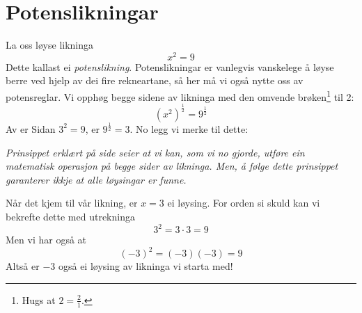 \newpage
{}
\section{Potenslikningar}
La oss løyse likninga
\[ x^2=9 \]
Dette kallast ei \textit{potenslikning}. Potenslikningar er vanlegvis vanskelege å løyse berre ved hjelp av dei fire rekneartane, så her må vi også nytte oss av potensreglar. Vi opphøg begge sidene av likninga med den omvende brøken\footnote{Hugs at $ 2=\frac{2}{1} $.} til 2:
\[ \left(x^2\right)^\frac{1}{2}=9^\frac{1}{2} \]
Av  er
Sidan $ 3^2=9 $, er $ 9^\frac{1}{2}=3 $. No legg vi merke til dette: \vsk

\textit{Prinsippet erklært på side \pageref{principle} seier at vi kan, som vi no gjorde, utføre ein matematisk operasjon på begge sider av likninga. Men, å følge dette prinsippet garanterer ikkje at alle løysingar er funne.} \\ \vsk

Når det kjem til vår likning, er $ {x=3} $ ei løysing. For orden si skuld kan vi bekrefte dette med utrekninga
\[ 3^2=3\cdot3=9 \]
Men vi har også at
\[ (-3)^2=(-3)(-3)=9 \]
Altså er $ -3 $ også ei løysing av likninga vi starta med! \regv

